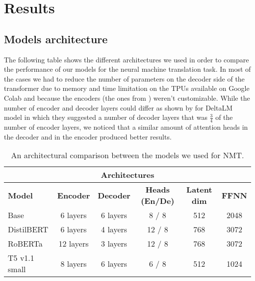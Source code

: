 \section{Results} \label{sec:results}
\subsection{Models architecture}
The following table shows the different architectures we used in order to compare the performance of our models for the neural machine translation task. In most of the cases we had to reduce the number of parameters on the decoder side of the transformer due to memory and time limitation on the TPUs available on Google Colab and because the encoders (the ones from \cite{huggingface_co}) weren't customizable. While the number of encoder and decoder layers could differ as shown by \cite{ma2021deltalm} for DeltaLM model in which they suggested a number of decoder layers that was $\frac{3}{4}$ of the number of encoder layers, we noticed that a similar amount of attention heads in the decoder and in the encoder produced better results.

\begin{table}[H]
\centering
\begin{tabular}{l|c|c|c|c|c}\hline \hline
\multicolumn{6}{c}{\textbf{Architectures}} \\\hline
\textbf{Model} & \textbf{Encoder} & \textbf{Decoder} & \textbf{Heads (En/De)} & \textbf{Latent dim} & \textbf{FFNN}\\\hline
Base & 6 layers & 6 layers & 8 / 8 & 512  & 2048 \\
DistilBERT & 6 layers & 4 layers & 12 / 8 & 768 & 3072 \\
RoBERTa & 12 layers & 3 layers & 12 / 8 & 768 & 3072\\
T5 v1.1 small & 8 layers & 6 layers & 6 / 8 & 512 & 1024\\\hline \hline
\end{tabular}
\caption{An architectural comparison between the models we used for NMT.}
\end{table}

